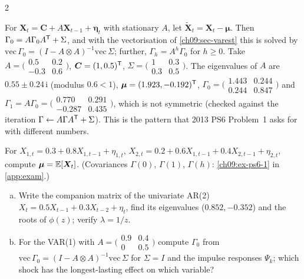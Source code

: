 \begin{paracol}{2}
\begin{example}\label{ch09:ex-var1}
For $\bm X_t=\bm C+A\bm X_{t-1}+\bm\eta_t$ with stationary $A$, let $\tilde{\bm X}_t=\bm X_t-\bm\mu$. Then
$\Gamma_0=A\Gamma_0A^{\mathsf T}+\Sigma$, and with the vectorisation of \cref{ch09:sec-varest} this is solved by
$\mathrm{vec}\,\Gamma_0=(I-A\otimes A)^{-1}\mathrm{vec}\,\Sigma$; further, $\Gamma_h=A^h\Gamma_0$ for $h\ge0$. Take
$A=\bigl(\begin{smallmatrix}0.5&0.2\\-0.3&0.6\end{smallmatrix}\bigr)$, $\bm C=(1,0.5)^{\mathsf T}$,
$\Sigma=\bigl(\begin{smallmatrix}1&0.3\\0.3&0.5\end{smallmatrix}\bigr)$. The eigenvalues of $A$ are $0.55\pm0.24\,\mathrm i$
(modulus $0.6<1$), $\bm\mu=(1.923,-0.192)^{\mathsf T}$,
$\Gamma_0=\bigl(\begin{smallmatrix}1.443&0.244\\0.244&0.847\end{smallmatrix}\bigr)$ and
$\Gamma_1=A\Gamma_0=\bigl(\begin{smallmatrix}0.770&0.291\\-0.287&0.435\end{smallmatrix}\bigr)$, which is not symmetric (checked against the
iteration $\Gamma\leftarrow A\Gamma A^{\mathsf T}+\Sigma$). This is the pattern that 2013 PS6 Problem~1 asks for with different numbers.
\end{example}

\begin{exercise}\label{ch09:ex-ps6-1-short}
For $X_{1,t}=0.3+0.8X_{1,t-1}+\eta_{1,t}$, $X_{2,t}=0.2+0.6X_{1,t-1}+0.4X_{2,t-1}+\eta_{2,t}$, compute $\bm\mu=\mathbb{E}[\bm X_t]$. (Covariances $\Gamma(0)$, $\Gamma(1)$, $\Gamma(h)$: \cref{ch09:ex-ps6-1} in \cref{app:exam}.)
\end{exercise}

\begin{exercise}\label{ch09:ex-x-companion}
\leavevmode
\begin{enumerate}[(a)]
  \item Write the companion matrix of the univariate AR(2) $X_t=0.5X_{t-1}+0.3X_{t-2}+\eta_t$, find its eigenvalues ($0.852,-0.352$) and the roots of $\phi(z)$; verify $\lambda=1/z$.
  \item For the VAR(1) with $A=\bigl(\begin{smallmatrix}0.9&0.4\\0&0.5\end{smallmatrix}\bigr)$ compute $\Gamma_0$ from $\mathrm{vec}\,\Gamma_0=(I-A\otimes A)^{-1}\mathrm{vec}\,\Sigma$ for $\Sigma=I$ and the impulse responses $\Psi_k$;
      which shock has the longest-lasting effect on which variable?
\end{enumerate}
\end{exercise}


\end{paracol}
